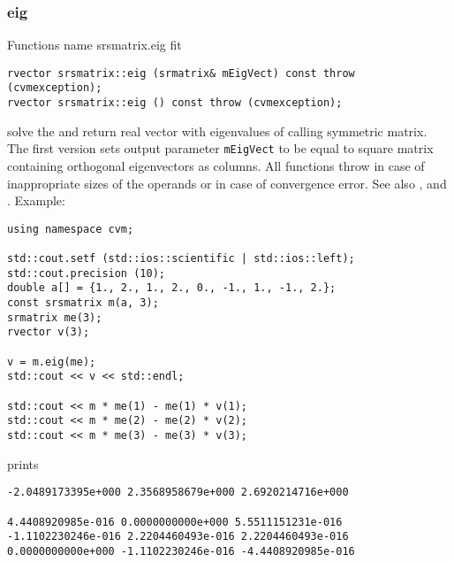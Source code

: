 \subsubsection{eig}
Functions%
\pdfdest name {srsmatrix.eig} fit
\begin{verbatim}
rvector srsmatrix::eig (srmatrix& mEigVect) const throw (cvmexception);
rvector srsmatrix::eig () const throw (cvmexception);
\end{verbatim}
solve the 
and return  real vector with eigenvalues
of  calling symmetric matrix.
The first version
sets  output parameter \verb"mEigVect" to be equal
to  square matrix containing orthogonal
eigenvectors as columns.
All  functions
throw 
in case of inappropriate sizes of the operands
or in case of convergence error.
See also
,
 and
.
Example:
\begin{Verbatim}
using namespace cvm;

std::cout.setf (std::ios::scientific | std::ios::left); 
std::cout.precision (10);
double a[] = {1., 2., 1., 2., 0., -1., 1., -1., 2.};
const srsmatrix m(a, 3);
srmatrix me(3);
rvector v(3);

v = m.eig(me);
std::cout << v << std::endl;

std::cout << m * me(1) - me(1) * v(1);
std::cout << m * me(2) - me(2) * v(2);
std::cout << m * me(3) - me(3) * v(3);
\end{Verbatim}
prints
\begin{Verbatim}
-2.0489173395e+000 2.3568958679e+000 2.6920214716e+000

4.4408920985e-016 0.0000000000e+000 5.5511151231e-016
-1.1102230246e-016 2.2204460493e-016 2.2204460493e-016
0.0000000000e+000 -1.1102230246e-016 -4.4408920985e-016
\end{Verbatim}
\newpage



